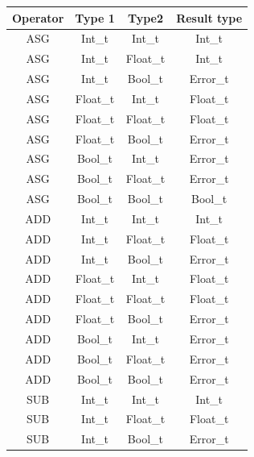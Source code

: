 \begin{figure}[H]
    \centering
    \begin{tabular}{cccc}
        \toprule
        \textbf{Operator} & \textbf{Type 1} & \textbf{Type2} & \textbf{Result type}\\
        \midrule ASG & Int\_t & Int\_t      & Int\_t \\
        \midrule ASG & Int\_t & Float\_t    & Int\_t \\
        \midrule ASG & Int\_t & Bool\_t     & Error\_t \\

        \midrule ASG & Float\_t & Int\_t    & Float\_t \\
        \midrule ASG & Float\_t & Float\_t  & Float\_t \\
        \midrule ASG & Float\_t & Bool\_t   & Error\_t \\

        \midrule ASG & Bool\_t & Int\_t     & Error\_t \\
        \midrule ASG & Bool\_t & Float\_t   & Error\_t \\
        \midrule ASG & Bool\_t & Bool\_t    & Bool\_t \\

        \midrule ADD & Int\_t & Int\_t      & Int\_t \\
        \midrule ADD & Int\_t & Float\_t    & Float\_t \\
        \midrule ADD & Int\_t & Bool\_t     & Error\_t \\

        \midrule ADD & Float\_t & Int\_t    & Float\_t \\
        \midrule ADD & Float\_t & Float\_t  & Float\_t \\
        \midrule ADD & Float\_t & Bool\_t   & Error\_t \\

        \midrule ADD & Bool\_t & Int\_t     & Error\_t \\
        \midrule ADD & Bool\_t & Float\_t   & Error\_t \\
        \midrule ADD & Bool\_t & Bool\_t    & Error\_t \\

        \midrule SUB & Int\_t & Int\_t      & Int\_t \\
        \midrule SUB & Int\_t & Float\_t    & Float\_t \\
        \midrule SUB & Int\_t & Bool\_t     & Error\_t \\


\end{tabular}
\end{figure}
